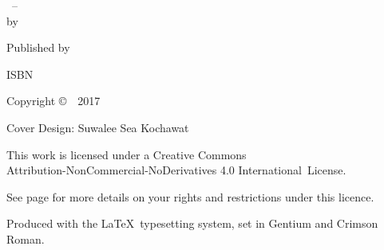 \cleartoverso
\thispagestyle{empty}

{\copyrightsize
\centering
\setlength{\parindent}{0pt}%
\setlength{\parskip}{0.8\baselineskip}%

\thetitle\ -- \thesubtitle\\
by \theauthor

Published by \thePublisher

ISBN \theISBN

Copyright \copyright\ \thePublisher\ 2017

Cover Design: Suwalee Sea Kochawat

\vfill

{\footnotesize

This work is licensed under a Creative Commons\\
Attribution-NonCommercial-NoDerivatives 4.0 International~License.

See page \pageref{copyright-details} for more details on your rights and restrictions under this licence.

Produced with the \LaTeX\ typesetting system, set in Gentium and Crimson Roman.

\theEditionInfo

}}
